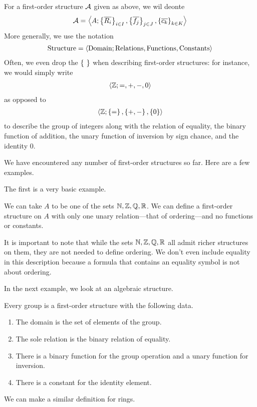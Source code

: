 \begin{boxconvention}
    For a first-order structure $\mathcal{A}$ given as above, we wil deonte
    \begin{align*}
        \mathcal{A} = \left\langle A; \left\{ \overline{R_i} \right\}_{i \in I}, \left\{ \overline{f_j} \right\}_{j \in J}, \left\{ \overline{c_k} \right\}_{k \in K} \right\rangle
    \end{align*}
    More generally, we use the notation
    \begin{align*}
        \text{Structure} = \left\langle \text{Domain}; \text{Relations}, \text{Functions}, \text{Constants} \right\rangle
    \end{align*}
    Often, we even drop the $\left\{ \  \right\}$ when describing first-order structures: for instance, we would simply write
    \begin{align*}
        \left\langle \mathbb{Z}; =, +, -, 0 \right\rangle
    \end{align*}
    as opposed to
    \begin{align*}
        \left\langle \mathbb{Z}; \left\{ = \right\}, \left\{ +, - \right\}, \left\{ 0 \right\} \right\rangle
    \end{align*}
    to describe the group of integers along with the relation of equality, the binary function of addition, the unary function of inversion by sign chance, and the identity $0$.
\end{boxconvention}

We have encountered any number of first-order structures so far. Here are a few examples.

The first is a very basic example.
\begin{boxexample}[Orderings]
    We can take $A$ to be one of the sets $\mathbb{N}, \mathbb{Z}, \mathbb{Q}, \mathbb{R}$. We can define a first-order structure on $A$ with only one unary relation---that of ordering---and no functions or constants.
\end{boxexample}
It is important to note that while the sets $\mathbb{N}, \mathbb{Z}, \mathbb{Q}, \mathbb{R}$ all admit richer structures on them, they are not needed to define ordering. We don't even include equality in this description because a formula that contains an equality symbol is not about ordering.

In the next example, we look at an algebraic structure.
\begin{boxexample}[Groups]
    Every group is a first-order structure with the following data.
    \begin{enumerate}
        \item The domain is the set of elements of the group.
        \item The sole relation is the binary relation of equality.
        \item There is a binary function for the group operation and a unary function for inversion.
        \item There is a constant for the identity element.
    \end{enumerate}
\end{boxexample}
We can make a similar definition for rings.

